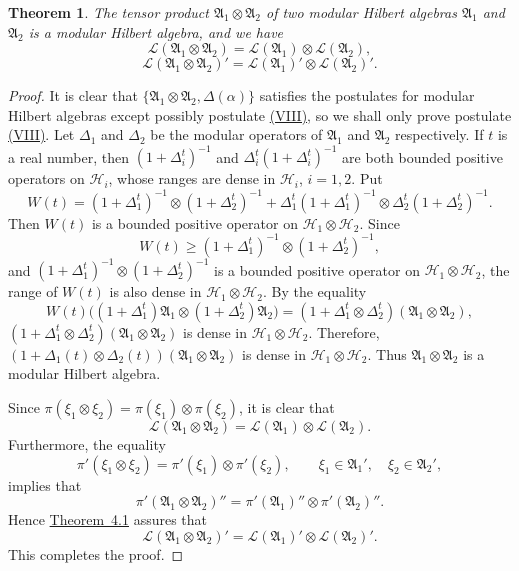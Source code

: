 \documentclass[12pt,b5paper,twoside]{article}
\theoremstyle{takesaki}
\newtheorem{theorem}{Theorem}[section]
\numberwithin{equation}{section}
\newcommand{\modcondref}[1]{\hyperref[cond:2.1:#1]{(#1)}}
\begin{document}
\begin{theorem}\label{thm:11.1}
The tensor product $\mathfrak A_1\otimes\mathfrak A_2$ of two modular
Hilbert algebras $\mathfrak A_1$ and $\mathfrak A_2$ is a modular
Hilbert algebra, and we have
\[
 \mathcal L(\mathfrak A_1\otimes\mathfrak A_2)
 =\mathcal L(\mathfrak A_1)\otimes
  \mathcal L(\mathfrak A_2),
\]
\[
 \mathcal L(\mathfrak A_1\otimes\mathfrak A_2)'
 =\mathcal L(\mathfrak A_1)'\otimes
  \mathcal L(\mathfrak A_2)'.
\]
\end{theorem}

\begin{proof}
It is clear that $\{\mathfrak A_1\otimes\mathfrak A_2,\Delta(\alpha)\}$
satisfies the postulates for modular Hilbert algebras except possibly
  postulate \modcondref{VIII}, so we shall only prove postulate \modcondref{VIII}.  Let
$\Delta_1$ and $\Delta_2$ be the modular operators of
$\mathfrak A_1$ and $\mathfrak A_2$ respectively.  If $t$ is a real
number, then $(1+\Delta_i^t)^{-1}$ and
$\Delta_i^t(1+\Delta_i^t)^{-1}$ are both bounded positive operators
on $\mathcal H_i$, whose ranges are dense in $\mathcal H_i$,
$i=1,2$.  Put
\[
 W(t)=(1+\Delta_1^t)^{-1}\otimes(1+\Delta_2^t)^{-1}
 +\Delta_1^t(1+\Delta_1^t)^{-1}\otimes
  \Delta_2^t(1+\Delta_2^t)^{-1}.
\]
Then $W(t)$ is a bounded positive operator on
$\mathcal H_1\otimes\mathcal H_2$.  Since
\[
 W(t)\geq(1+\Delta_1^t)^{-1}\otimes(1+\Delta_2^t)^{-1},
\]
and $(1+\Delta_1^t)^{-1}\otimes(1+\Delta_2^t)^{-1}$ is a bounded
positive operator on $\mathcal H_1\otimes\mathcal H_2$, the range of
$W(t)$ is also dense in $\mathcal H_1\otimes\mathcal H_2$.  By the
equality
\[
 W(t)\bigl((1+\Delta_1^t)\mathfrak A_1\otimes
 (1+\Delta_2^t)\mathfrak A_2\bigr)
 =(1+\Delta_1^t\otimes\Delta_2^t)
 (\mathfrak A_1\otimes\mathfrak A_2),
\]
$(1+\Delta_1^t\otimes\Delta_2^t)
(\mathfrak A_1\otimes\mathfrak A_2)$ is dense in
$\mathcal H_1\otimes\mathcal H_2$.  Therefore,
$(1+\Delta_1(t)\otimes\Delta_2(t))
(\mathfrak A_1\otimes\mathfrak A_2)$ is dense in
$\mathcal H_1\otimes\mathcal H_2$.  Thus
$\mathfrak A_1\otimes\mathfrak A_2$ is a modular Hilbert algebra.

Since $\pi(\xi_1\otimes\xi_2)=\pi(\xi_1)\otimes\pi(\xi_2)$, it is
clear that
\[
 \mathcal L(\mathfrak A_1\otimes\mathfrak A_2)
 =\mathcal L(\mathfrak A_1)\otimes
  \mathcal L(\mathfrak A_2).
\]
Furthermore, the equality
\[
 \pi'(\xi_1\otimes\xi_2)
 =\pi'(\xi_1)\otimes\pi'(\xi_2),
 \qquad \xi_1\in\mathfrak A_1',\quad\xi_2\in\mathfrak A_2',
\]
implies that
\[
 \pi'(\mathfrak A_1\otimes\mathfrak A_2)''
 =\pi'(\mathfrak A_1)''\otimes
  \pi'(\mathfrak A_2)''.
\]
Hence \hyperref[thm:4.1]{Theorem~4.1} assures that
\[
 \mathcal L(\mathfrak A_1\otimes\mathfrak A_2)'
 =\mathcal L(\mathfrak A_1)'\otimes
  \mathcal L(\mathfrak A_2)'.
\]
This completes the proof.
\end{proof}
\end{document}
